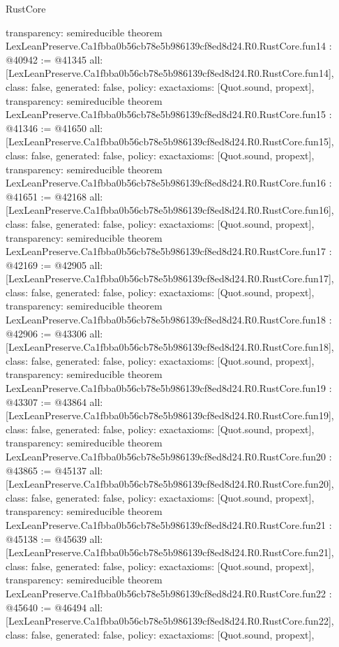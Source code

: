 \begin{lexlean}{RustCore}
\begin{coremodule}
{  transparency: semireducible
}
theorem LexLeanPreserve.Ca1fbba0b56cb78e5b986139cf8ed8d24.R0.RustCore.fun14 : @40942 := @41345 {
  all: [LexLeanPreserve.Ca1fbba0b56cb78e5b986139cf8ed8d24.R0.RustCore.fun14],
  class: false,
  generated: false,
  policy: exact{axioms: [Quot.sound, propext]},
  transparency: semireducible
}
theorem LexLeanPreserve.Ca1fbba0b56cb78e5b986139cf8ed8d24.R0.RustCore.fun15 : @41346 := @41650 {
  all: [LexLeanPreserve.Ca1fbba0b56cb78e5b986139cf8ed8d24.R0.RustCore.fun15],
  class: false,
  generated: false,
  policy: exact{axioms: [Quot.sound, propext]},
  transparency: semireducible
}
theorem LexLeanPreserve.Ca1fbba0b56cb78e5b986139cf8ed8d24.R0.RustCore.fun16 : @41651 := @42168 {
  all: [LexLeanPreserve.Ca1fbba0b56cb78e5b986139cf8ed8d24.R0.RustCore.fun16],
  class: false,
  generated: false,
  policy: exact{axioms: [Quot.sound, propext]},
  transparency: semireducible
}
theorem LexLeanPreserve.Ca1fbba0b56cb78e5b986139cf8ed8d24.R0.RustCore.fun17 : @42169 := @42905 {
  all: [LexLeanPreserve.Ca1fbba0b56cb78e5b986139cf8ed8d24.R0.RustCore.fun17],
  class: false,
  generated: false,
  policy: exact{axioms: [Quot.sound, propext]},
  transparency: semireducible
}
theorem LexLeanPreserve.Ca1fbba0b56cb78e5b986139cf8ed8d24.R0.RustCore.fun18 : @42906 := @43306 {
  all: [LexLeanPreserve.Ca1fbba0b56cb78e5b986139cf8ed8d24.R0.RustCore.fun18],
  class: false,
  generated: false,
  policy: exact{axioms: [Quot.sound, propext]},
  transparency: semireducible
}
theorem LexLeanPreserve.Ca1fbba0b56cb78e5b986139cf8ed8d24.R0.RustCore.fun19 : @43307 := @43864 {
  all: [LexLeanPreserve.Ca1fbba0b56cb78e5b986139cf8ed8d24.R0.RustCore.fun19],
  class: false,
  generated: false,
  policy: exact{axioms: [Quot.sound, propext]},
  transparency: semireducible
}
theorem LexLeanPreserve.Ca1fbba0b56cb78e5b986139cf8ed8d24.R0.RustCore.fun20 : @43865 := @45137 {
  all: [LexLeanPreserve.Ca1fbba0b56cb78e5b986139cf8ed8d24.R0.RustCore.fun20],
  class: false,
  generated: false,
  policy: exact{axioms: [Quot.sound, propext]},
  transparency: semireducible
}
theorem LexLeanPreserve.Ca1fbba0b56cb78e5b986139cf8ed8d24.R0.RustCore.fun21 : @45138 := @45639 {
  all: [LexLeanPreserve.Ca1fbba0b56cb78e5b986139cf8ed8d24.R0.RustCore.fun21],
  class: false,
  generated: false,
  policy: exact{axioms: [Quot.sound, propext]},
  transparency: semireducible
}
theorem LexLeanPreserve.Ca1fbba0b56cb78e5b986139cf8ed8d24.R0.RustCore.fun22 : @45640 := @46494 {
  all: [LexLeanPreserve.Ca1fbba0b56cb78e5b986139cf8ed8d24.R0.RustCore.fun22],
  class: false,
  generated: false,
  policy: exact{axioms: [Quot.sound, propext]},
}
\end{coremodule}
\end{lexlean}
